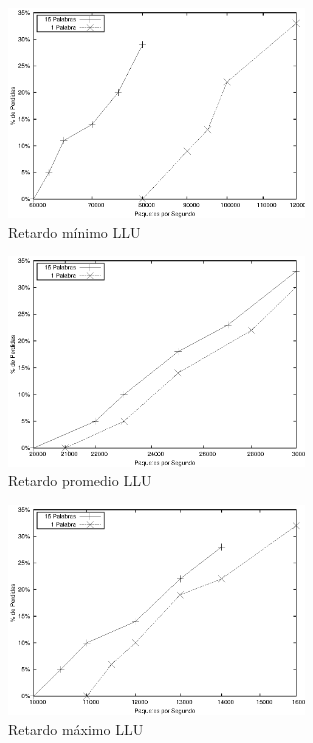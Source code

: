 \begin{figure}[!h]
  \centering
	\includegraphics[width=0.7\textwidth]{5-resultados/graf/llumin.eps}
  \caption{Retardo mínimo LLU}
  \label{figminllu}
\end{figure}
\begin{figure}[!h]
  \centering
	\includegraphics[width=0.7\textwidth]{5-resultados/graf/lluprom.eps}
  \caption{Retardo promedio LLU}
  \label{figpromllu}
\newpage
\end{figure}
\begin{figure}[!h]
  \centering
	\includegraphics[width=0.7\textwidth]{5-resultados/graf/llumax.eps}
  \caption{Retardo máximo LLU}
  \label{figmaxllu}
\end{figure}



